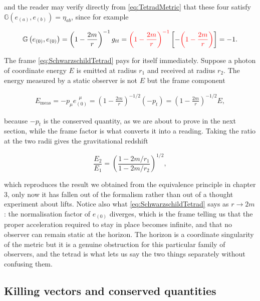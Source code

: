         and the reader may verify directly from \ref{eq:TetradMetric} that these four satisfy $\mathbb{G}(e_{(a)},e_{(b)})=\eta_{ab}$, since for example

        \begin{align*}
            \mathbb{G}\left(e_{(0)},e_{(0)}\right) = \left(1-\frac{2m}{r}\right)^{-1}g_{tt} = {\color{red}\left(1-\frac{2m}{r}\right)^{-1}}\left[-{\color{red}\left(1-\frac{2m}{r}\right)}\right] = -1.
        \end{align*}

        The frame \ref{eq:SchwarzschildTetrad} pays for itself immediately. Suppose a photon of coordinate energy $E$ is emitted at radius $r_1$ and received at radius $r_2$. The energy measured by a static observer is not $E$ but the frame component

        \begin{align*}
            E_{\text{meas}} = -p_{\mu}e_{(0)}^{\;\;\mu} = \left(1-\frac{2m}{r}\right)^{-1/2}\left(-p_t\right) = \left(1-\frac{2m}{r}\right)^{-1/2}E,
        \end{align*}

        because $-p_t$ is the conserved quantity, as we are about to prove in the next section, while the frame factor is what converts it into a reading. Taking the ratio at the two radii gives the gravitational redshift

        \begin{equation}\label{eq:RedshiftTetrad}
            \frac{E_2}{E_1} = \left(\frac{1-2m/r_1}{1-2m/r_2}\right)^{1/2},
        \end{equation}

        which reproduces the result we obtained from the equivalence principle in chapter 3, only now it has fallen out of the formalism rather than out of a thought experiment about lifts. Notice also what \ref{eq:SchwarzschildTetrad} says as $r\rightarrow 2m$: the normalisation factor of $e_{(0)}$ diverges, which is the frame telling us that the proper acceleration required to stay in place becomes infinite, and that no observer can remain static at the horizon. The horizon is a coordinate singularity of the metric but it is a genuine obstruction for this particular family of observers, and the tetrad is what lets us say the two things separately without confusing them.

    \subsection{Killing vectors and conserved quantities}


